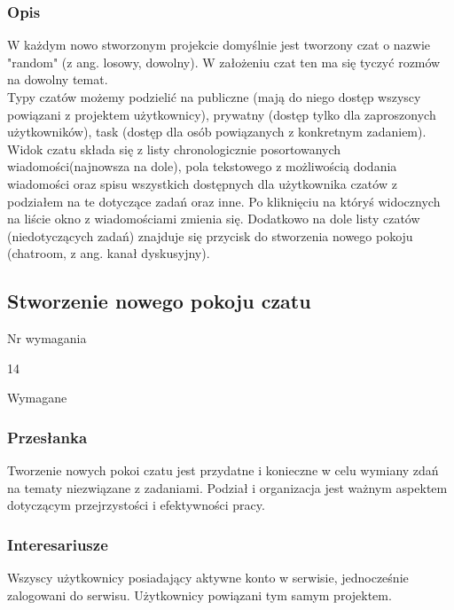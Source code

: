 \documentclass[eng,printmode]{mgr}
\begin{document}
\subsubsection{Opis}
W każdym nowo stworzonym projekcie domyślnie jest tworzony czat o nazwie "random" (z ang. losowy, dowolny). W założeniu czat ten ma się tyczyć rozmów na dowolny temat. \\
Typy czatów możemy podzielić na publiczne (mają do niego dostęp wszyscy powiązani z projektem użytkownicy), prywatny (dostęp tylko dla zaproszonych użytkowników), task (dostęp dla osób powiązanych z konkretnym zadaniem).
\\
Widok czatu składa się z listy chronologicznie posortowanych wiadomości(najnowsza na dole), pola tekstowego z możliwością dodania wiadomości oraz spisu wszystkich dostępnych dla użytkownika czatów z podziałem na te dotyczące zadań oraz inne. Po kliknięciu na któryś widocznych na liście okno z wiadomościami zmienia się. Dodatkowo na dole listy czatów (niedotyczących zadań) znajduje się przycisk do stworzenia nowego pokoju (chatroom, z ang. kanał dyskusyjny).

\subsection{Stworzenie nowego pokoju czatu}
\begin{labeling}{Nr wymagania}
\item [Nr wymagania:] 14
\item [Priorytet:] Wymagane
\end{labeling}

\subsubsection{Przesłanka}
Tworzenie nowych pokoi czatu jest przydatne i konieczne w celu wymiany zdań na tematy niezwiązane z zadaniami. Podział i organizacja jest ważnym aspektem dotyczącym przejrzystości i efektywności pracy.

\subsubsection{Interesariusze}
Wszyscy użytkownicy posiadający aktywne konto w serwisie, jednocześnie zalogowani do serwisu. Użytkownicy powiązani tym samym projektem.
\end{document}

